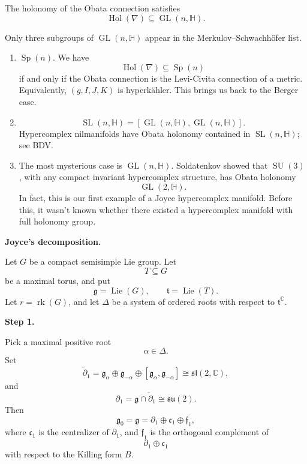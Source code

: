 The holonomy of the Obata connection
satisfies
\[
\operatorname{Hol}(\nabla)
\subseteq
\operatorname{GL}(n,\mathbb{H}).
\]

Only three subgroups of
$\operatorname{GL}(n,\mathbb{H})$
appear in the
Merkulov--Schwachh\"ofer list.

\begin{enumerate}
\item $\operatorname{Sp}(n)$.
We have
\[
\operatorname{Hol}(\nabla)
\subseteq
\operatorname{Sp}(n)
\]
if and only if the Obata connection is
the Levi-Civita connection of a
metric.
Equivalently, $(g,I,J,K)$ is
hyperk\"ahler. This brings us back
to the Berger case.

\item
\[
\operatorname{SL}(n,\mathbb{H})
=
[\operatorname{GL}(n,\mathbb{H}),
\operatorname{GL}(n,\mathbb{H})].
\]
Hypercomplex nilmanifolds have Obata
holonomy contained in
$\operatorname{SL}(n,\mathbb{H})$;
see BDV.

\item The most mysterious case is
$\operatorname{GL}(n,\mathbb{H})$.
Soldatenkov showed that
$\operatorname{SU}(3)$, with any
compact invariant hypercomplex
structure, has Obata holonomy
\[
\operatorname{GL}(2,\mathbb{H}).
\]
In fact, this is our first example of
a Joyce hypercomplex manifold.
Before this, it wasn't known whether
there existed a hypercomplex manifold
with full holonomy group.
\end{enumerate}

\medskip\noindent
{\bf Joyce's decomposition.}

Let $G$ be a compact semisimple Lie
group.
Let
\[
T\subseteq G
\]
be a maximal torus, and put
\[
\mathfrak g=\operatorname{Lie}(G),
\qquad
\mathfrak t=\operatorname{Lie}(T).
\]
Let $r=\operatorname{rk}(G)$, and let
$\Delta$ be a system of ordered roots
with respect to $\mathfrak t^\mathbb C$.



\medskip\noindent
{\bf Step 1.}

Pick a maximal positive root
\[
\alpha\in\Delta.
\]
Set
\[
\widetilde{\partial}_1
=
\mathfrak g_\alpha
\oplus
\mathfrak g_{-\alpha}
\oplus
[\mathfrak g_\alpha,\mathfrak g_{-\alpha}]
\cong
\mathfrak{sl}(2,\mathbb{C}),
\]
and
\[
\partial_1
=
\mathfrak g\cap\widetilde{\partial}_1
\cong
\mathfrak{su}(2).
\]
Then
\[
\mathfrak g_0=\mathfrak g
=
\partial_1
\oplus
\mathfrak c_1
\oplus
\mathfrak f_1,
\]
where $\mathfrak c_1$ is the
centralizer of $\partial_1$, and
$\mathfrak f_1$ is the orthogonal
complement of
\[
\partial_1\oplus\mathfrak c_1
\]
with respect to the Killing form $B$.

